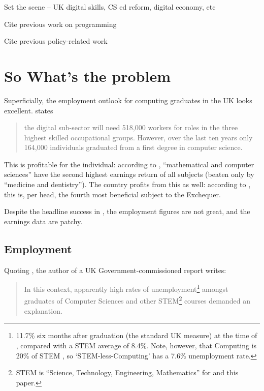 \documentclass[sigconf]{acmart}
\begin{document}

Set the scene -- UK digital skills, CS ed reform, digital economy, etc

Cite previous work on
programming~\cite{davenport-et-al:latice2016,murphy-et-al:programming2017,simon-et-al:sigcse2018}

Cite previous policy-related
work~\cite{crick+sentance:2011,brown-et-al:sigcse2013,brown-et-al:toce2014,crick+moller:wipsce2015,moller+crick:jce2018}

\section{So What's the problem}

Superficially, the employment outlook for computing graduates in the
UK looks excellent. \cite[p.~74]{UKCES2015b} states
\begin{quote} the digital sub-sector will need 518,000 workers for
roles in the three highest skilled occupational groups. However, over
the last ten years only 164,000 individuals graduated from a first
degree in computer science.
\end{quote} This is profitable for the individual: according to
\cite[Figure 4]{BIS2011a}, ``mathematical and computer sciences'' have
the second highest earnings return of all subjects (beaten only by
``medicine and dentistry'').  The country profits from this as well:
according to \cite[p.~16]{BIS2011a}, this is, per head, the fourth
most beneficial subject to the Exchequer.


Despite the headline success in \cite{BIS2011a}, the employment
figures are not great, and the earnings data are patchy.

\subsection{Employment}

Quoting \cite{UKCES2015b}, the author of a UK Government-commissioned
report \cite{Shadbolt2016a} writes:

\begin{quote} In this context, apparently high rates of
unemployment\footnote{11.7\% six months after graduation (the standard
UK measure) at the time of \cite{Shadbolt2016a}, compared with a STEM
average of 8.4\%. Note, however, that Computing is 20\% of STEM
\cite[Table 1]{Wakeham2016a}, so `STEM-less-Computing' has a 7.6\%
unemployment rate.} amongst graduates of Computer Sciences and other
STEM\footnote{STEM is ``Science, Technology, Engineering,
Mathematics'' for \cite{Shadbolt2016a} and this paper.} courses
demanded an explanation.
\end{quote}
\end{document}
